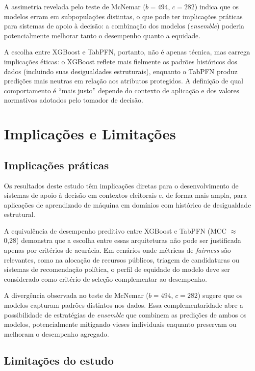 \documentclass[12pt]{article}
\begin{document}
A assimetria revelada pelo teste de McNemar ($b = 494$, $c = 282$) indica que os modelos erram em subpopulações distintas, o que pode ter implicações práticas para sistemas de apoio à decisão: a combinação dos modelos (\textit{ensemble}) poderia potencialmente melhorar tanto o desempenho quanto a equidade.

A escolha entre XGBoost e TabPFN, portanto, não é apenas técnica, mas carrega implicações éticas: o XGBoost reflete mais fielmente os padrões históricos dos dados (incluindo suas desigualdades estruturais), enquanto o TabPFN produz predições mais neutras em relação aos atributos protegidos. A definição de qual comportamento é ``mais justo'' depende do contexto de aplicação e dos valores normativos adotados pelo tomador de decisão.

\section{Implicações e Limitações}

\subsection{Implicações práticas}

Os resultados deste estudo têm implicações diretas para o desenvolvimento de sistemas de apoio à decisão em contextos eleitorais e, de forma mais ampla, para aplicações de aprendizado de máquina em domínios com histórico de desigualdade estrutural.

A equivalência de desempenho preditivo entre XGBoost e TabPFN (MCC $\approx$ 0,28) demonstra que a escolha entre essas arquiteturas não pode ser justificada apenas por critérios de acurácia. Em cenários onde métricas de \textit{fairness} são relevantes, como na alocação de recursos públicos, triagem de candidaturas ou sistemas de recomendação política, o perfil de equidade do modelo deve ser considerado como critério de seleção complementar ao desempenho.

A divergência observada no teste de McNemar ($b = 494$, $c = 282$) sugere que os modelos capturam padrões distintos nos dados. Essa complementaridade abre a possibilidade de estratégias de \textit{ensemble} que combinem as predições de ambos os modelos, potencialmente mitigando vieses individuais enquanto preservam ou melhoram o desempenho agregado.

\subsection{Limitações do estudo}
\end{document}
